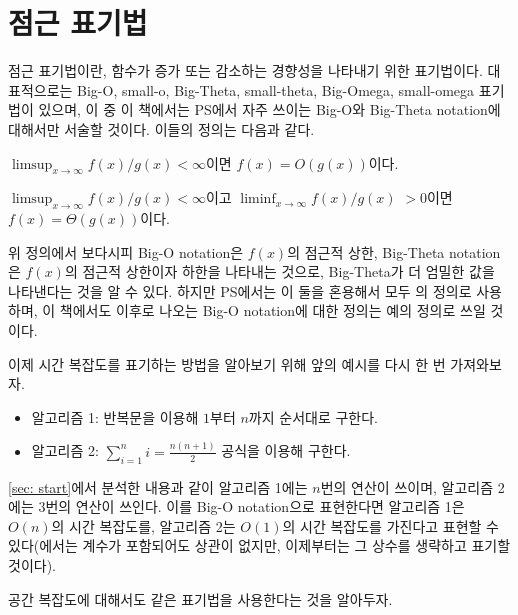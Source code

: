\section{점근 표기법}
점근 표기법이란, 함수가 증가 또는 감소하는 경향성을 나타내기 위한 표기법이다. 대표적으로는 Big-O, small-o, Big-Theta, small-theta, Big-Omega, small-omega 표기법이 있으며, 이 중 이 책에서는 PS에서 자주 쓰이는 Big-O와 Big-Theta notation에 대해서만 서술할 것이다. 이들의 정의는 다음과 같다.
\begin{definition}
    $\limsup_{x\to\infty} f(x)/g(x)<\infty$이면 $f(x)=O(g(x))$이다.
\end{definition}
\begin{definition}\label{def: big-theta}
    $\limsup_{x\to\infty} f(x)/g(x)<\infty$이고 $\liminf_{x\to\infty} f(x)/g(x)$ $>0$이면 $f(x)=\Theta(g(x))$이다.
\end{definition}
위 정의에서 보다시피 Big-O notation은 $f(x)$의 점근적 상한, Big-Theta notation은 $f(x)$의 점근적 상한이자 하한을 나타내는 것으로, Big-Theta가 더 엄밀한 값을 나타낸다는 것을 알 수 있다. 하지만 PS에서는 이 둘을 혼용해서 모두 의 정의로 사용하며, 이 책에서도 이후로 나오는 Big-O notation에 대한 정의는 예의 정의로 쓰일 것이다.

이제 시간 복잡도를 표기하는 방법을 알아보기 위해 앞의 예시를 다시 한 번 가져와보자.
\begin{itemize}
    \item 알고리즘 1: 반복문을 이용해 $1$부터 $n$까지 순서대로 구한다.
    \item 알고리즘 2: $\sum_{i=1}^n i = \frac{n(n+1)}{2}$ 공식을 이용해 구한다.
\end{itemize}
\cref{sec: start}에서 분석한 내용과 같이 알고리즘 1에는 $n$번의 연산이 쓰이며, 알고리즘 2에는 3번의 연산이 쓰인다. 이를 Big-O notation으로 표현한다면 알고리즘 1은 $O(n)$의 시간 복잡도를, 알고리즘 2는 $O(1)$의 시간 복잡도를 가진다고 표현할 수 있다(에서는 계수가 포함되어도 상관이 없지만, 이제부터는 그 상수를 생략하고 표기할 것이다).

공간 복잡도에 대해서도 같은 표기법을 사용한다는 것을 알아두자.

